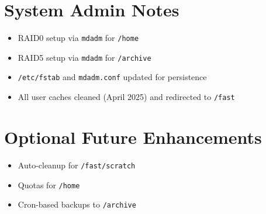 \documentclass{article}
\begin{document}
\section*{System Admin Notes}
\begin{itemize}
  \item RAID0 setup via \texttt{mdadm} for \texttt{/home}
  \item RAID5 setup via \texttt{mdadm} for \texttt{/archive}
  \item \texttt{/etc/fstab} and \texttt{mdadm.conf} updated for persistence
  \item All user caches cleaned (April 2025) and redirected to \texttt{/fast}
\end{itemize}

\section*{Optional Future Enhancements}
\begin{itemize}
  \item Auto-cleanup for \texttt{/fast/scratch}
  \item Quotas for \texttt{/home}
  \item Cron-based backups to \texttt{/archive}
\end{itemize}
\end{document}
